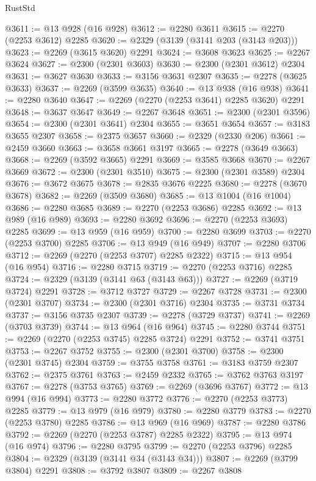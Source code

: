 \begin{lexlean}{RustStd}
\begin{coremodule}
@3611 := @13 @928 (@16 @928)
@3612 := @2280 @3611
@3615 := @2270 (@2253 @3612) @2285
@3620 := @2329 (@3139 (@3141 @203 (@3143 @203)))
@3623 := @2269 (@3615 @3620) @2291
@3624 := @3608 @3623
@3625 := @2267 @3624
@3627 := @2300 (@2301 @3603)
@3630 := @2300 (@2301 @3612) @2304
@3631 := @3627 @3630
@3633 := @3156 @3631 @2307
@3635 := @2278 (@3625 @3633)
@3637 := @2269 (@3599 @3635)
@3640 := @13 @938 (@16 @938)
@3641 := @2280 @3640
@3647 := @2269 (@2270 (@2253 @3641) @2285 @3620) @2291
@3648 := @3637 @3647
@3649 := @2267 @3648
@3651 := @2300 (@2301 @3596)
@3654 := @2300 (@2301 @3641) @2304
@3655 := @3651 @3654
@3657 := @3183 @3655 @2307
@3658 := @2375 @3657
@3660 := @2329 (@2330 @206)
@3661 := @2459 @3660
@3663 := @3658 @3661 @3197
@3665 := @2278 (@3649 @3663)
@3668 := @2269 (@3592 @3665) @2291
@3669 := @3585 @3668
@3670 := @2267 @3669
@3672 := @2300 (@2301 @3510)
@3675 := @2300 (@2301 @3589) @2304
@3676 := @3672 @3675
@3678 := @2835 @3676 @2225
@3680 := @2278 (@3670 @3678)
@3682 := @2269 (@3509 @3680)
@3685 := @13 @1004 (@16 @1004)
@3686 := @2280 @3685
@3689 := @2270 (@2253 @3686) @2285
@3692 := @13 @989 (@16 @989)
@3693 := @2280 @3692
@3696 := @2270 (@2253 @3693) @2285
@3699 := @13 @959 (@16 @959)
@3700 := @2280 @3699
@3703 := @2270 (@2253 @3700) @2285
@3706 := @13 @949 (@16 @949)
@3707 := @2280 @3706
@3712 := @2269 (@2270 (@2253 @3707) @2285 @2322)
@3715 := @13 @954 (@16 @954)
@3716 := @2280 @3715
@3719 := @2270 (@2253 @3716) @2285
@3724 := @2329 (@3139 (@3141 @63 (@3143 @63)))
@3727 := @2269 (@3719 @3724) @2291
@3728 := @3712 @3727
@3729 := @2267 @3728
@3731 := @2300 (@2301 @3707)
@3734 := @2300 (@2301 @3716) @2304
@3735 := @3731 @3734
@3737 := @3156 @3735 @2307
@3739 := @2278 (@3729 @3737)
@3741 := @2269 (@3703 @3739)
@3744 := @13 @964 (@16 @964)
@3745 := @2280 @3744
@3751 := @2269 (@2270 (@2253 @3745) @2285 @3724) @2291
@3752 := @3741 @3751
@3753 := @2267 @3752
@3755 := @2300 (@2301 @3700)
@3758 := @2300 (@2301 @3745) @2304
@3759 := @3755 @3758
@3761 := @3183 @3759 @2307
@3762 := @2375 @3761
@3763 := @2459 @2332
@3765 := @3762 @3763 @3197
@3767 := @2278 (@3753 @3765)
@3769 := @2269 (@3696 @3767)
@3772 := @13 @994 (@16 @994)
@3773 := @2280 @3772
@3776 := @2270 (@2253 @3773) @2285
@3779 := @13 @979 (@16 @979)
@3780 := @2280 @3779
@3783 := @2270 (@2253 @3780) @2285
@3786 := @13 @969 (@16 @969)
@3787 := @2280 @3786
@3792 := @2269 (@2270 (@2253 @3787) @2285 @2322)
@3795 := @13 @974 (@16 @974)
@3796 := @2280 @3795
@3799 := @2270 (@2253 @3796) @2285
@3804 := @2329 (@3139 (@3141 @34 (@3143 @34)))
@3807 := @2269 (@3799 @3804) @2291
@3808 := @3792 @3807
@3809 := @2267 @3808

\end{coremodule}
\end{lexlean}
